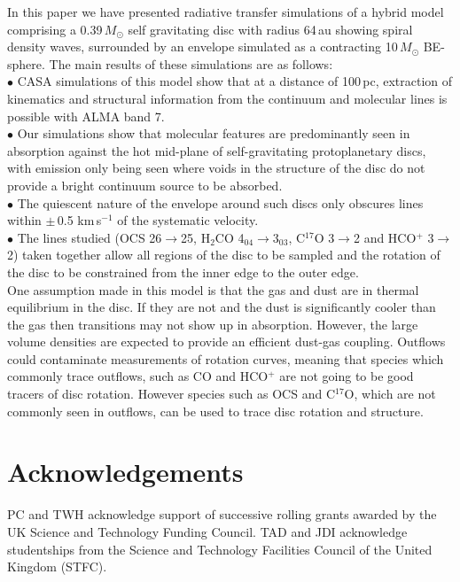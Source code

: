 \documentclass[useAMS,usenatbib]{mn2e}
\begin{document}
In this paper we have presented radiative transfer simulations of a hybrid model comprising a 0.39$\, M_\odot$ self gravitating disc with radius 64$\,$au showing spiral density waves, surrounded by an envelope simulated as a contracting 10$\,M_\odot$ BE-sphere. The main results of these simulations are as follows:\\
$\bullet$ CASA simulations of this model show that at a distance of 100$\,$pc, extraction of kinematics and structural information from the continuum and molecular lines is possible with ALMA band 7.\\
$\bullet$ Our simulations show that molecular features are predominantly seen in absorption against the hot mid-plane of self-gravitating protoplanetary discs, with emission only being seen where voids in the structure of the disc do not provide a bright continuum source to be absorbed.\\
$\bullet$ The quiescent nature of the envelope around such discs only obscures lines within $\pm\,$0.5 km$\,$s$^{-1}$ of the systematic velocity.\\
$\bullet$ The lines studied (OCS 26$\rightarrow$25, H$_2$CO 4$_{04}$$\rightarrow$3$_{03}$, C$^{17}$O 3$\rightarrow$2 and HCO$^+$ 3$\rightarrow$2) taken together allow all regions of the disc to be sampled and the rotation of the disc to be constrained from the inner edge to the outer edge.\\


One assumption made in this model is that the gas and dust are in thermal equilibrium in the disc. If they are not and the dust is significantly cooler than the gas then transitions may not show up in absorption. However, the large volume densities are expected to provide an efficient dust-gas coupling. Outflows could contaminate measurements of rotation curves, meaning that species  which commonly trace outflows, such as CO and HCO$^+$ are not going to be good tracers of disc rotation. However species such as OCS and C$^{17}$O, which are not commonly seen in outflows, can be used to trace disc rotation and structure.\smallskip

\section*{Acknowledgements}
PC and TWH acknowledge support of successive rolling grants awarded by the UK Science and Technology Funding Council. 
TAD and JDI acknowledge studentships from the Science and Technology Facilities Council of the United Kingdom (STFC).
\end{document}
